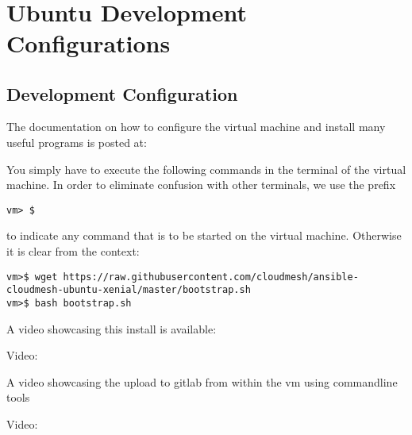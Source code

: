 \FILENAME\
\section{Ubuntu Development Configurations}

\subsection{Development Configuration}

The documentation on how to configure the virtual machine and install many useful programs is posted at:


You simply have to execute the following commands in the terminal of the virtual machine. In order to eliminate confusion with other terminals, we use the prefix 
\begin{verbatim}
vm> $ 
\end{verbatim}

to indicate any command that is to be started on the virtual machine. Otherwise it is clear from the context:

\begin{lstlisting}
vm>$ wget https://raw.githubusercontent.com/cloudmesh/ansible-cloudmesh-ubuntu-xenial/master/bootstrap.sh
vm>$ bash bootstrap.sh
\end{lstlisting} 

A video showcasing this install is available:

Video: 

A video showcasing the upload to gitlab from within the vm using commandline tools

Video: 
